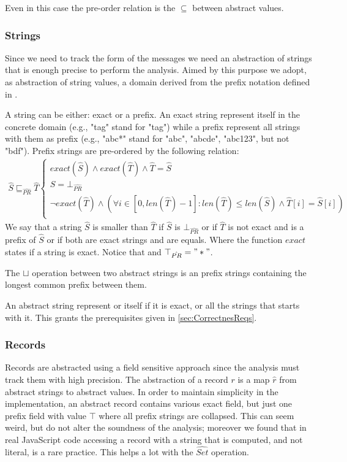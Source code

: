 Even in this case the pre-order relation is the $\subseteq$ between abstract values.

\subsubsection{Strings}
Since we need to track the form of the messages we need an abstraction of strings that is enough precise to perform the analysis. Aimed by this purpose we adopt, as abstraction of string values, a domain derived from the prefix notation defined in \cite{StringAbstraction}. 

A string can be either: exact or a prefix. An exact string represent itself in the concrete domain (e.g., "tag" stand for "tag") while a prefix represent all strings with them as prefix (e.g., "abc*" stand for "abc", "abcde", "abc123", but not "bdf"). Prefix strings are pre-ordered by the following relation:
\begin{align*}
\hat{S} \sqsubseteq_{\hat{PR}} \hat{T}
\begin{cases}
    exact(\hat{S}) \wedge exact(\hat{T}) \wedge \hat{T} = \hat{S} \\ 
    S = \bot_{\hat{PR}}\\
    \neg exact(\hat{T}) \wedge (\forall i \in [0, len(\hat{T}) - 1] : len(\hat{T}) \leq len(\hat{S}) \wedge \hat{T}[i] = \hat{S}[i])\\
\end{cases}
\end{align*}
We say that a string $\hat{S}$ is smaller than $\hat{T}$ if $\hat{S}$ is $\bot_{\hat{PR}}$ or if $\hat{T}$ is not exact and is a prefix of $\hat{S}$ or if both are exact strings and are equals. Where the function $exact$ states if a string is exact.
Notice that and $\top_{\hat{PR}} = "*"$.

The $\sqcup$ operation between two abstract strings is an prefix strings containing the longest common prefix between them.

An abstract string represent or itself if it is exact, or all the strings that starts with it. This grants the prerequisites given in \ref{sec:CorrectnesReqs}.

\subsubsection{Records}
Records are abstracted using a field sensitive approach since the analysis must track them with high precision. The abstraction of a record $r$ is a map $\hat{r}$ from abstract strings to abstract values. In order to maintain simplicity in the implementation, an abstract record contains various exact field, but just one prefix field with value $\top$ where all prefix strings are collapsed. This can seem weird, but do not alter the soundness of the analysis; moreover we found that in real JavaScript code accessing a record with a string that is computed, and not literal, is a rare practice. This helps a lot with the $\widehat{Set}$ operation.

